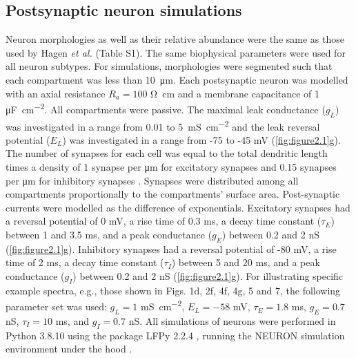 \subsection{Postsynaptic neuron simulations}
Neuron morphologies as well as their relative abundance were the same as those used by Hagen \textit{et al.} \cite{Hagen2016} (Table S1). The same biophysical parameters were used for all neuron subtypes. For simulations, morphologies were segmented such that each compartment was less than \qty{10}{\micro\meter}. Each postsynaptic neuron was modelled with an axial resistance $R_a=100$ \unit{\ohm \centi\meter} and a membrane capacitance of 1 \unit{\micro\farad\per\centi\meter\squared}. All compartments were passive. The maximal leak conductance ($g_L$) was investigated in a range from 0.01 to \qty{5}{\milli\siemens\per\centi\meter\squared} and the leak reversal potential ($E_L$) was investigated in a range from -75 to -45 \unit{\milli\volt} (\autoref{fig:figure2.1}g). The number of synapses for each cell was equal to the total dendritic length times a density of 1 synapse per \unit{\micro\meter} for excitatory synapses and 0.15 synapses per \unit{\micro\meter} for inhibitory synapses \cite{Iacaruso2017, Karimi2020, Palmer2012}. Synapses were distributed among all compartments proportionally to the compartments’ surface area. Post-synaptic currents were modelled as the difference of exponentials. Excitatory synapses had a reversal potential of 0 \unit{\milli\volt}, a rise time of 0.3 ms, a decay time constant ($\tau_E$) between 1 and 3.5 ms, and a peak conductance ($g_E$) between 0.2 and 2 \unit{\nano\siemens} (\autoref{fig:figure2.1}g). Inhibitory synapses had a reversal potential of -80 \unit{\milli\volt}, a rise time of 2 ms, a decay time constant ($\tau_I$) between 5 and 20 ms, and a peak conductance ($g_I$) between 0.2 and 2 \unit{\nano\siemens} (\autoref{fig:figure2.1}g). For illustrating specific example spectra, e.g., those shown in Figs. 1d, 2f, 4f, 4g, 5 and 7, the following parameter set was used: $g_L = 1$ \unit{\milli\siemens\per\centi\meter\squared}, $E_L = -58$ \unit{\milli\volt}, $\tau_E = 1.8$ ms, $g_E = 0.7$ \unit{\nano\siemens}, $\tau_I = 10$ \unit{\milli\second}, and $g_I = 0.7$ \unit{\nano\siemens}. All simulations of neurons were performed in Python 3.8.10 using the package LFPy 2.2.4 \cite{Hagen2018}, running the NEURON simulation environment under the hood \cite{Carnevale2006}.

